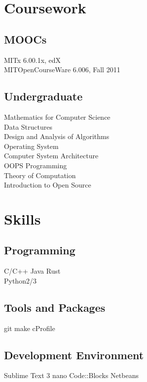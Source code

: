 \documentclass[]{deedy-resume-openfont}
\begin{document}
\begin{minipage}[t]{0.33\textwidth}

\section{Coursework}
\subsection{MOOCs}
MITx 6.00.1x, edX \\
MITOpenCourseWare 6.006, Fall 2011\\
\sectionsep

\subsection{Undergraduate}
Mathematics for Computer Science \\
Data Structures \\
Design and Analysis of Algorithms \\
Operating System \\
Computer System Architecture \\
OOPS Programming \\
Theory of Computation \\
Introduction to Open Source \\
\sectionsep


\section{Skills}
\subsection{Programming}
\textbullet{} C/C++ \textbullet{} Java \textbullet{} Rust \\
\textbullet{}Python2/3
\subsection{Tools and Packages}
\textbullet{} git \textbullet{} make \textbullet{} cProfile  
\subsection{Development Environment}
\textbullet{} Sublime Text 3 \textbullet{} nano \textbullet{} Code::Blocks \textbullet{} Netbeans
\sectionsep

%
%

\end{minipage}
\end{document}
